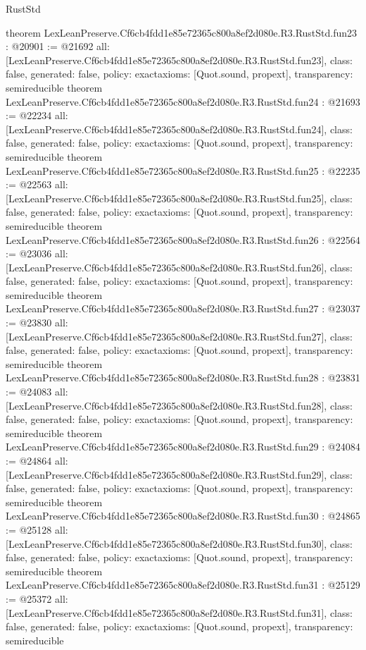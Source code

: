 \begin{lexlean}{RustStd}
\begin{coremodule}
{}
theorem LexLeanPreserve.Cf6cb4fdd1e85e72365c800a8ef2d080e.R3.RustStd.fun23 : @20901 := @21692 {
  all: [LexLeanPreserve.Cf6cb4fdd1e85e72365c800a8ef2d080e.R3.RustStd.fun23],
  class: false,
  generated: false,
  policy: exact{axioms: [Quot.sound, propext]},
  transparency: semireducible
}
theorem LexLeanPreserve.Cf6cb4fdd1e85e72365c800a8ef2d080e.R3.RustStd.fun24 : @21693 := @22234 {
  all: [LexLeanPreserve.Cf6cb4fdd1e85e72365c800a8ef2d080e.R3.RustStd.fun24],
  class: false,
  generated: false,
  policy: exact{axioms: [Quot.sound, propext]},
  transparency: semireducible
}
theorem LexLeanPreserve.Cf6cb4fdd1e85e72365c800a8ef2d080e.R3.RustStd.fun25 : @22235 := @22563 {
  all: [LexLeanPreserve.Cf6cb4fdd1e85e72365c800a8ef2d080e.R3.RustStd.fun25],
  class: false,
  generated: false,
  policy: exact{axioms: [Quot.sound, propext]},
  transparency: semireducible
}
theorem LexLeanPreserve.Cf6cb4fdd1e85e72365c800a8ef2d080e.R3.RustStd.fun26 : @22564 := @23036 {
  all: [LexLeanPreserve.Cf6cb4fdd1e85e72365c800a8ef2d080e.R3.RustStd.fun26],
  class: false,
  generated: false,
  policy: exact{axioms: [Quot.sound, propext]},
  transparency: semireducible
}
theorem LexLeanPreserve.Cf6cb4fdd1e85e72365c800a8ef2d080e.R3.RustStd.fun27 : @23037 := @23830 {
  all: [LexLeanPreserve.Cf6cb4fdd1e85e72365c800a8ef2d080e.R3.RustStd.fun27],
  class: false,
  generated: false,
  policy: exact{axioms: [Quot.sound, propext]},
  transparency: semireducible
}
theorem LexLeanPreserve.Cf6cb4fdd1e85e72365c800a8ef2d080e.R3.RustStd.fun28 : @23831 := @24083 {
  all: [LexLeanPreserve.Cf6cb4fdd1e85e72365c800a8ef2d080e.R3.RustStd.fun28],
  class: false,
  generated: false,
  policy: exact{axioms: [Quot.sound, propext]},
  transparency: semireducible
}
theorem LexLeanPreserve.Cf6cb4fdd1e85e72365c800a8ef2d080e.R3.RustStd.fun29 : @24084 := @24864 {
  all: [LexLeanPreserve.Cf6cb4fdd1e85e72365c800a8ef2d080e.R3.RustStd.fun29],
  class: false,
  generated: false,
  policy: exact{axioms: [Quot.sound, propext]},
  transparency: semireducible
}
theorem LexLeanPreserve.Cf6cb4fdd1e85e72365c800a8ef2d080e.R3.RustStd.fun30 : @24865 := @25128 {
  all: [LexLeanPreserve.Cf6cb4fdd1e85e72365c800a8ef2d080e.R3.RustStd.fun30],
  class: false,
  generated: false,
  policy: exact{axioms: [Quot.sound, propext]},
  transparency: semireducible
}
theorem LexLeanPreserve.Cf6cb4fdd1e85e72365c800a8ef2d080e.R3.RustStd.fun31 : @25129 := @25372 {
  all: [LexLeanPreserve.Cf6cb4fdd1e85e72365c800a8ef2d080e.R3.RustStd.fun31],
  class: false,
  generated: false,
  policy: exact{axioms: [Quot.sound, propext]},
  transparency: semireducible
}
\end{coremodule}
\end{lexlean}

